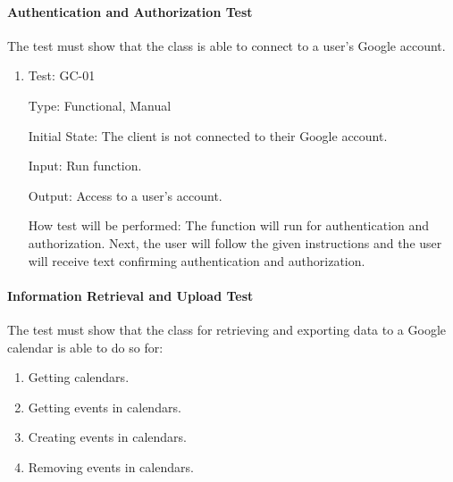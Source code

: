 \documentclass[12pt, titlepage]{article}
\begin{document}
\paragraph{Authentication and Authorization Test}
The test must show that the class is able to connect to a user's Google account.
\begin{enumerate}

\item{Test: GC-01\\}

Type: Functional, Manual
					
Initial State: The client is not connected to their Google account. 
					
Input: Run function.
					
Output: Access to a user's account.
					
How test will be performed: The function will run for authentication and authorization. 
Next, the user will follow the given instructions and the user will receive text confirming authentication and authorization.
\end{enumerate}

\paragraph{Information Retrieval and Upload Test}

The test must show that the class for retrieving and exporting data to a Google calendar is able to do so for:
\begin{enumerate}
    \item Getting calendars.
    \item Getting events in calendars.
    \item Creating events in calendars.
    \item Removing events in calendars.
\end{enumerate}
\end{document}

